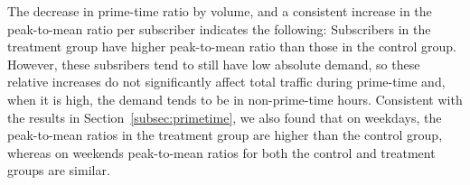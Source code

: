 The decrease in prime-time ratio by volume, and a consistent increase in
the peak-to-mean ratio per subscriber indicates the following:
Subscribers in the treatment group have higher peak-to-mean ratio than
those in the control group. However, these subsribers tend to still have
low absolute demand, so these relative increases do not significantly
affect total traffic during prime-time and, when it is high, the demand
tends to be in non-prime-time hours.  Consistent with the results in
Section~\ref{subsec:primetime}, we also found that on weekdays, the
peak-to-mean ratios in the treatment group are higher than the control
group, whereas on weekends peak-to-mean ratios for both the control and
treatment groups are similar. 
